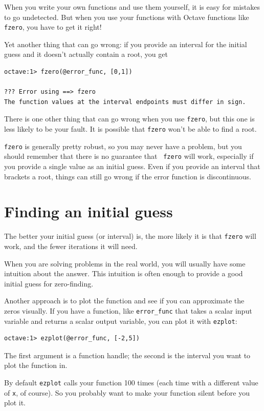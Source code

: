\documentclass{book}
\begin{document}
When you write your own functions and use them yourself, it is easy
for mistakes to go undetected. But when you use your functions with
Octave functions like {\tt fzero}, you have to get it right!

Yet another thing that can go wrong: if you provide an interval for the
initial guess and it doesn't actually contain a root, you get

\begin{verbatim}
octave:1> fzero(@error_func, [0,1])

??? Error using ==> fzero
The function values at the interval endpoints must differ in sign.
\end{verbatim}

There is one other thing that can go wrong when you use {\tt fzero}, but
this one is less likely to be your fault. It is possible that {\tt fzero}
won't be able to find a root.

{\tt fzero} is generally pretty robust, so you may never have a
problem, but you should remember that there is no guarantee that {\tt
fzero} will work, especially if you provide a single value as an
initial guess. Even if you provide an interval that brackets a root,
things can still go wrong if the error function is discontinuous.


\section{Finding an initial guess}

The better your initial guess (or interval) is, the more likely
it is that {\tt fzero} will work, and the fewer iterations it will
need.

When you are solving problems in the real world, you will usually
have some intuition about the answer. This intuition is often enough
to provide a good initial guess for zero-finding.

Another approach is to plot the function and see if you can
approximate the zeros visually. If you have a function, like
{\tt error\_func} that takes a scalar input variable and returns
a scalar output variable, you can plot it with {\tt ezplot}:

\begin{verbatim}
octave:1> ezplot(@error_func, [-2,5])
\end{verbatim}

The first argument is a function handle; the second is the 
interval you want to plot the function in.

By default {\tt ezplot} calls your function 100 times (each time
with a different value of {\tt x}, of course). So you probably want
to make your function silent before you plot it.
\end{document}
